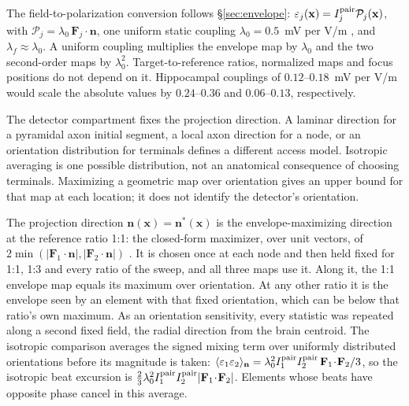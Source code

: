 \documentclass[11pt,a4paper]{article}
\providecommand{\DIFaddtex}[1]{{\protect\color{blue} \sf #1}} %
\providecommand{\DIFadd}[1]{\texorpdfstring{\DIFaddtex{#1}}{#1}} %
\begin{document}
\DIFadd{The field-to-polarization conversion follows \S\ref{sec:envelope}:
$\varepsilon_j(\mathbf x)=I_j^{\rm pair}\mathcal P_j(\mathbf x)$, with
$\mathcal P_j=\lambda_0\,\mathbf F_j\!\cdot\!\mathbf n$, one uniform
static coupling $\lambda_0=0.5$~mV per V/m \cite{radman2009}, and
$\lambda_f\approx\lambda_0$. A uniform coupling multiplies the envelope map by
$\lambda_0$ and the two second-order maps by $\lambda_0^2$. Target-to-reference ratios,
normalized maps and focus positions do not depend on it. Hippocampal couplings of
$0.12$--$0.18$~mV per V/m \cite{bikson2004,deans2007} would scale the absolute values
by $0.24$--$0.36$ and $0.06$--$0.13$, respectively.
}

\DIFadd{The detector compartment fixes the projection direction. A laminar direction for a pyramidal
axon initial segment, a local axon direction for a node, or an orientation
distribution for terminals defines a different access model. Isotropic averaging
is one possible distribution, not an anatomical consequence of choosing terminals.
Maximizing a geometric map over orientation gives an upper bound for that map
at each location; it does not identify the detector's orientation.
}

\DIFadd{The projection direction $\mathbf n(\mathbf x)=\mathbf n^*(\mathbf x)$ is the envelope-maximizing direction at
the reference ratio 1:1: the closed-form maximizer, over unit vectors, of
$2\min(|\mathbf F_1\!\cdot\!\mathbf n|,|\mathbf F_2\!\cdot\!\mathbf n|)$
\cite{grossman2017}. It is chosen once at each node and then held fixed for 1:1, 1:3
and every ratio of the sweep, and all three maps use it. Along it, the 1:1 envelope map
equals its maximum over orientation. At any other ratio it is the envelope seen by an
element with that fixed orientation, which can be below that ratio's own maximum. As an
orientation sensitivity, every statistic was repeated along a second fixed field, the
radial direction from the brain centroid. The isotropic comparison averages the signed
mixing term over uniformly distributed orientations before its magnitude is taken:
$\langle\varepsilon_1\varepsilon_2\rangle_{\mathbf n}
=\lambda_0^2I_1^{\rm pair}I_2^{\rm pair}\,\mathbf F_1\!\cdot\!\mathbf F_2/3$, so the
isotropic beat excursion is
$\tfrac23\lambda_0^2I_1^{\rm pair}I_2^{\rm pair}|\mathbf F_1\!\cdot\!\mathbf F_2|$.
Elements whose beats have opposite phase cancel in this average.
}
\end{document}
